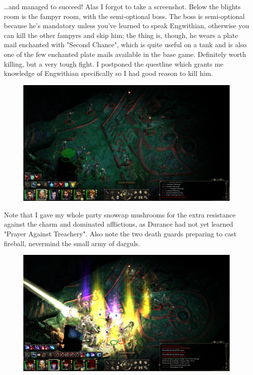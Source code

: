 \documentclass{article}
\begin{document}
\ldots and managed to succeed!  Alas I forgot to take a screenshot.  Below the blights room is the fampyr room, with the semi-optional boss.  The boss is semi-optional because he's mandatory unless you've learned to speak Engwithian, otherwise you can kill the other fampyrs and skip him; the thing is, though, he wears a plate mail enchanted with "Second Chance", which is quite useful on a tank and is also one of the few enchanted plate mails available in the base game.  Definitely worth killing, but a very tough fight.  I postponed the questline which grants me knowledge of Engwithian specifically so I had good reason to kill him.

\begin{figure}
\includegraphics[scale=0.33]{files/blog/2018_11_25_pillars_of_eternity_path_of_the_damned_act_ii/2018_11_25_fampyr01.jpg}
\end{figure}

Note that I gave my whole party snowcap mushrooms for the extra resistance against the charm and dominated afflictions, as Durance had not yet learned "Prayer Against Treachery".  Also note the two death guards preparing to cast fireball, nevermind the small army of darguls.

\begin{figure}
\includegraphics[scale=0.33]{files/blog/2018_11_25_pillars_of_eternity_path_of_the_damned_act_ii/2018_11_25_fampyr02.jpg}
\end{figure}
\end{document}
